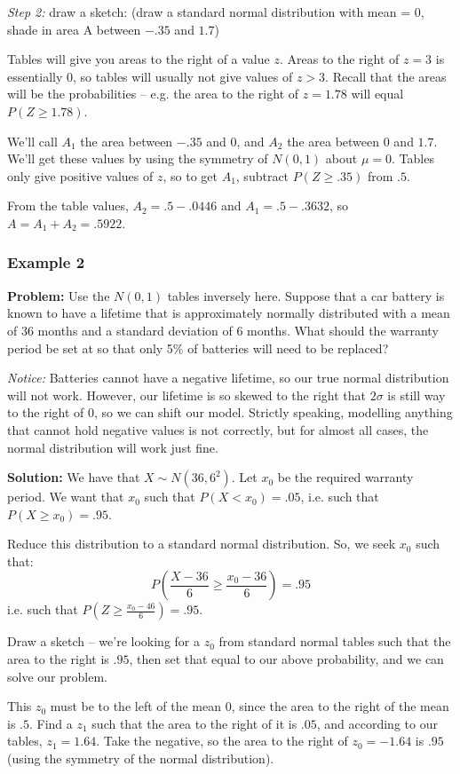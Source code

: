 \documentclass[12pt]{article}
\begin{document}
\emph{Step 2:} draw a sketch: (draw a standard normal distribution with mean = 0, shade in area A between $-.35$ and $1.7$)

Tables will give you areas to the right of a value $z$. Areas to the right of $z=3$ is essentially 0, so tables will usually not give values of $z>3$. Recall that the areas will be the probabilities -- e.g. the area to the right of $z=1.78$ will equal $P(Z \geq 1.78)$.

We'll call $A_1$ the area between $-.35$ and 0, and $A_2$ the area between $0$ and $1.7$. We'll get these values by using the symmetry of $N(0,1)$ about $\mu = 0$. Tables only give positive values of $z$, so to get $A_1$, subtract $P( Z \geq .35)$ from $.5$. 

From the table values, $A_2 = .5 - .0446$ and $A_1 = .5 - .3632$, so $A = A_1 + A_2 = .5922$.

\subsubsection{Example 2}
\textbf{Problem:} Use the $N(0,1)$ tables inversely here. Suppose that a car battery is known to have a lifetime that is approximately normally distributed with a mean of 36 months and a standard deviation of 6 months. What should the warranty period be set at so that only 5\% of batteries will need to be replaced?

\emph{Notice:} Batteries cannot have a negative lifetime, so our true normal distribution will not work. However, our lifetime is so skewed to the right that $2 \sigma$ is still way to the right of $0$, so we can shift our model. Strictly speaking, modelling anything that cannot hold negative values is not correctly, but for almost all cases, the normal distribution will work just fine.

\textbf{Solution:} We have that $X \sim N(36,6^2)$. Let $x_0$ be the required warranty period. We want that $x_0$ such that $P(X < x_0) = .05$, i.e. such that $P(X \geq x_0) = .95$. 

Reduce this distribution to a standard normal distribution. So, we seek $x_0$ such that:
\[
    P(\frac{X-36}{6} \geq \frac{x_0 - 36}{6}) = .95
\]
i.e. such that $P(Z \geq \frac{x_0 - 46}{6}) = .95$.

Draw a sketch -- we're looking for a $z_0$ from standard normal tables such that the area to the right is $.95$, then set that equal to our above probability, and we can solve our problem.

This $z_0$ must be to the left of the mean 0, since the area to the right of the mean is $.5$. Find a $z_1$ such that the area to the right of it is $.05$, and according to our tables, $z_1 = 1.64$. Take the negative, so the area to the right of $z_0 = -1.64$ is $.95$ (using the symmetry of the normal distribution). 
\end{document}
